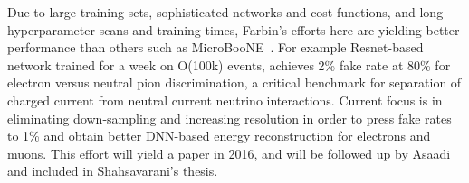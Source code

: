 Due to large training sets, sophisticated networks and cost functions,
and long hyperparameter scans and training times, Farbin's efforts
here are yielding better performance than others such as
MicroBooNE~\cite{}. For example Resnet-based network trained for a
week on O(100k) events, achieves 2\% fake rate at 80\% for electron
versus neutral pion discrimination, a critical benchmark for
separation of charged current from neutral current neutrino
interactions. Current focus is in eliminating down-sampling and
increasing resolution in order to press fake rates to 1\% and obtain
better DNN-based energy reconstruction for electrons and muons. This
effort will yield a paper in 2016, and will be followed up by Asaadi
and included in Shahsavarani's thesis.




